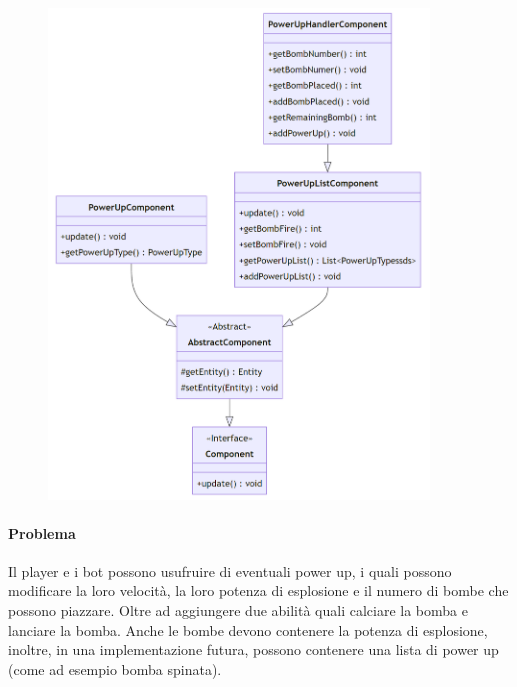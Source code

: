 \documentclass[a4paper,12pt]{report}
\begin{document}
\begin{figure}[H]
    \centering{}
    \includegraphics[width=0.90\textwidth]{img/UMLPowerUp.png}
    \caption{}
\end{figure}

\paragraph{Problema} Il player e i bot possono usufruire di eventuali power up, i quali possono modificare la loro velocità, la loro potenza di esplosione e il numero di bombe che possono piazzare. Oltre ad aggiungere due abilità quali calciare la bomba e lanciare la bomba. Anche le bombe devono contenere la potenza di esplosione, inoltre, in una implementazione futura, possono contenere una lista di power up (come ad esempio bomba spinata).
\end{document}
